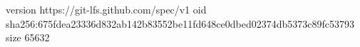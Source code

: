 version https://git-lfs.github.com/spec/v1
oid sha256:675fdea23336d832ab142b83552be11fd648ce0dbed02374db5373c89fc53793
size 65632
